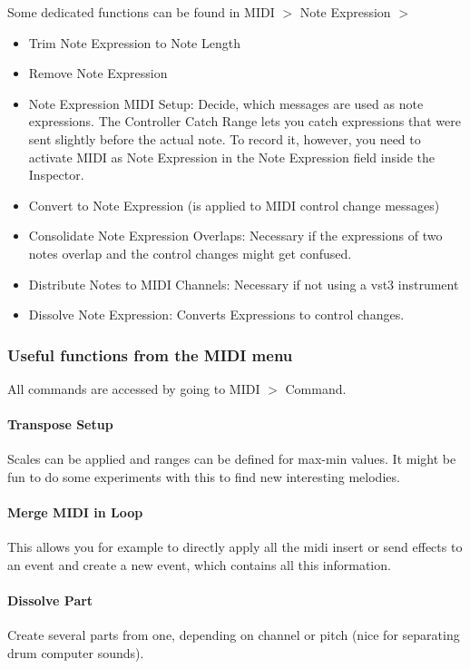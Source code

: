 \documentclass[10pt]{article}
\begin{document}
Some dedicated functions can be found in MIDI $>$ Note Expression $>$
\begin{itemize}
	\item Trim Note Expression to Note Length
	\item Remove Note Expression
	\item Note Expression MIDI Setup: Decide, which messages are used as note expressions. The Controller Catch Range lets you catch expressions that were sent slightly before the actual note. To record it, however, you need to activate MIDI as Note Expression in the Note Expression field inside the Inspector.
	\item Convert to Note Expression (is applied to MIDI control change messages)
	\item Consolidate Note Expression Overlaps: Necessary if the expressions of two notes overlap and the control changes might get confused.
	\item Distribute Notes to MIDI Channels: Necessary if not using a vst3 instrument
	\item Dissolve Note Expression: Converts Expressions to control changes.
\end{itemize}

\subsubsection{Useful functions from the MIDI menu} All commands are accessed by going to MIDI $>$ Command.

\paragraph{Transpose Setup} Scales can be applied and ranges can be defined for max-min values. It might be fun to do some experiments with this to find new interesting melodies.

\paragraph{Merge MIDI in Loop} This allows you for example to directly apply all the midi insert or send effects to an event and create a new event, which contains all this information.

\paragraph{Dissolve Part} Create several parts from one, depending on channel or pitch (nice for separating drum computer sounds).
\end{document}
